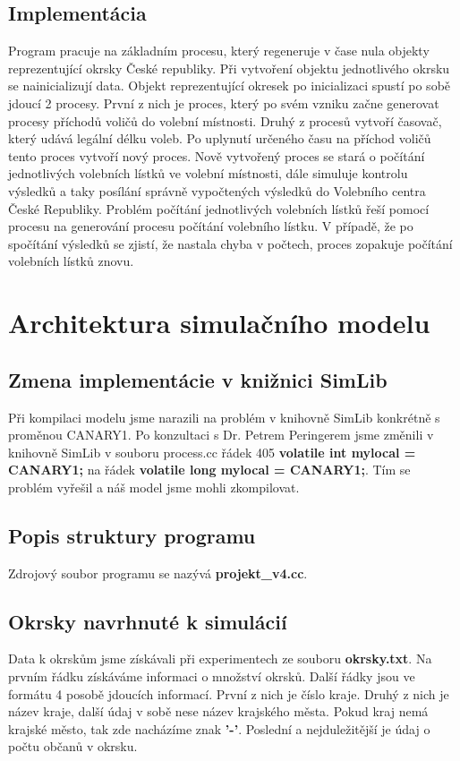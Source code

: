 \documentclass[12pt,a4paper,titlepage,final]{article}
\begin{document}
\subsection{Implementácia}
Program pracuje na základním procesu, který regeneruje v čase nula objekty reprezentující okrsky České republiky. Při vytvoření objektu jednotlivého okrsku se nainicializují data. Objekt reprezentující okresek po inicializaci spustí po sobě jdoucí 2 procesy. První z nich je proces, který po svém vzniku začne generovat procesy příchodů voličů do volební místnosti. Druhý z procesů vytvoří časovač, který udává legální délku voleb. Po uplynutí určeného času na příchod voličů tento proces vytvoří nový proces. Nově vytvořený proces se stará o počítání jednotlivých volebních lístků ve volební místnosti, dále simuluje kontrolu výsledků a taky posílání správně vypočtených výsledků do Volebního centra České Republiky. Problém počítání jednotlivých volebních lístků řeší pomocí procesu na generování procesu počítání volebního lístku. V případě, že po spočítání výsledků se zjistí, že nastala chyba v počtech, proces zopakuje počítání volebních lístků znovu. 


\section{Architektura simulačního modelu}

\subsection{Zmena implementácie v knižnici SimLib}
Při kompilaci modelu jsme narazili na problém v knihovně SimLib konkrétně s proměnou CANARY1. Po konzultaci s Dr. Petrem Peringerem jsme změnili v knihovně SimLib v souboru process.cc řádek 405 \textbf{volatile int mylocal = CANARY1;} na řádek \textbf{volatile long mylocal = CANARY1;}. Tím se problém vyřešil a náš model jsme mohli zkompilovat.

\subsection{Popis struktury programu}
Zdrojový soubor programu  se  nazývá \textbf{projekt_v4.cc}.

\subsection{Okrsky navrhnuté k simulácií}
Data k okrskům jsme získávali při experimentech ze souboru \textbf{okrsky.txt}. Na prvním řádku získáváme informaci o množství okrsků. Další řádky jsou ve formátu 4 posobě jdoucích informací. První z nich je číslo kraje. Druhý z nich je název kraje, další údaj v sobě nese název krajského města. Pokud kraj nemá krajské město, tak zde nacházíme znak \textbf{'-'}. Poslední a nejduležitější je údaj o počtu občanů v okrsku.
\end{document}
